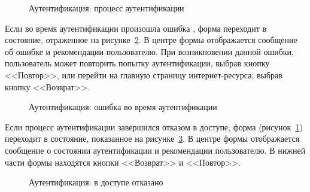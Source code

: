 \begin{figure}[hbt!]
\caption{Аутентификация: процесс аутентификации}
\label{fig:verification_in_process}
\end{figure}

Если во время аутентификации произошла ошибка , форма переходит в состояние, отраженное на рисунке~\ref{fig:verification_error}. В центре формы отображается сообщение об ошибке и рекомендации пользователю. При возникновении данной ошибки, пользователь может повторить попытку аутентификации, выбрав кнопку <<Повтор>>, или перейти на главную страницу интернет-ресурса, выбрав кнопку <<Возврат>>. 


\begin{figure}[hbt!]
\caption{Аутентификация: ошибка во время аутентификации}
\label{fig:verification_error}
\end{figure}

Если процесс аутентификации завершился отказом в доступе, форма (рисунок~\ref{fig:verification_in_process}) переходит в состояние, показанное на рисунке~\ref{fig:verification_access_denied}. В центре формы отображается сообщение о состоянии аутентификации и рекомендации пользователю. В нижней части формы находятся кнопки <<Возврат>> и <<Повтор>>.


\begin{figure}[hbt!]
\caption{Аутентификация: в доступе отказано}
\label{fig:verification_access_denied}
\end{figure}

